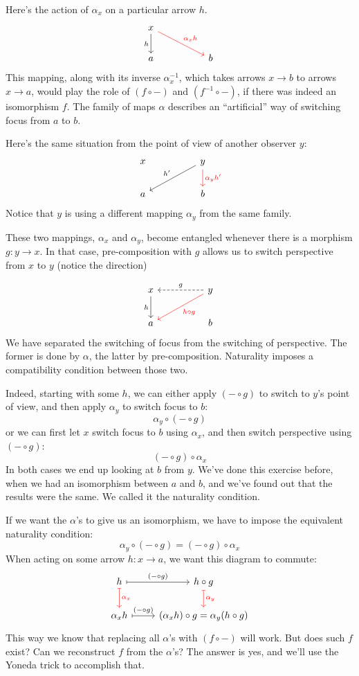 \documentclass[DaoFP]{subfiles}
\begin{document}
Here's the action of $\alpha_x$ on a particular arrow $h$. 
\[
 \begin{tikzcd}
 x
 \arrow[d, "h"']
 \arrow[rrd, red, "\alpha_x h"]
  \\
 a
  && b
 \end{tikzcd}
\]
This mapping, along with its inverse $\alpha^{-1}_x$, which takes arrows $x \to b$ to arrows $x \to a$, would play the role of $(f \circ -)$ and $(f^{-1} \circ -)$, if there was indeed an isomorphism $f$. The family of maps $\alpha$ describes an ``artificial'' way of switching focus from $a$ to $b$.

Here's the same situation from the point of view of another observer $y$:
\[
 \begin{tikzcd}
 x
  && y
 \arrow[lld, "h'"']
 \arrow[d, red, "\alpha_y h'"]
 \\
 a
  && b
 \end{tikzcd}
\]
Notice that $y$ is using a different mapping $\alpha_y$ from the same family. 

These two mappings, $\alpha_x$ and $\alpha_y$, become entangled whenever there is a morphism $g \colon y \to x$. In that case, pre-composition with $g$ allows us to switch perspective from $x$ to $y$ (notice the direction)

\[
 \begin{tikzcd}
 x
 \arrow[d, "h"']
 && y
 \arrow[ll, dashed, "g"']
 \arrow[lld, red, "h \circ g"]
 \\
 a
  && b
 \end{tikzcd}
\]
We have separated the switching of focus from the switching of perspective. The former is done by $\alpha$, the latter by pre-composition. Naturality imposes a compatibility condition between those two.

Indeed, starting with some $h$, we can either apply $(- \circ g)$ to switch to $y$'s point of view, and then apply $\alpha_y$ to switch focus to $b$:
\[ \alpha_y \circ (- \circ g) \]
or we can first let $x$ switch focus to $b$ using $\alpha_x$, and then switch perspective using $(- \circ g)$:
\[ (- \circ g) \circ \alpha_x \]
In both cases we end up looking at $b$ from $y$. We've done this exercise before, when we had an isomorphism between $a$ and $b$, and we've found out that the results were the same. We called it the naturality condition. 

If we want the $\alpha$'s to give us an isomorphism, we have to impose the equivalent naturality condition:
\[ \alpha_y \circ (- \circ g) = (- \circ g) \circ \alpha_x \]
When acting on some arrow $h \colon x \to a$, we want this diagram to commute:
\[
 \begin{tikzcd}
 h
 \arrow[r, mapsto, "(- \circ g)"]
 \arrow[d, mapsto, red, "\alpha_x"]
 & h \circ g
 \arrow[d, mapsto, red, "\alpha_y"]
 \\
 \alpha_x h
 \arrow[r, mapsto, "(- \circ g)"]
&(\alpha_x h) \circ g = \alpha_y (h \circ g)
 \end{tikzcd}
\]
This way we know that replacing all $\alpha$'s with $(f \circ -)$ will work. But does such $f$ exist? Can we reconstruct $f$ from the $\alpha$'s? The answer is yes, and we'll use the Yoneda trick to accomplish that.
\end{document}
